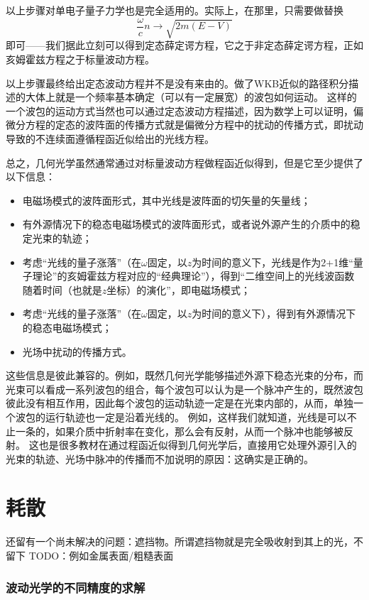 以上步骤对单电子量子力学也是完全适用的。实际上，在那里，只需要做替换
\[
    \frac{\omega}{c} n \longrightarrow \sqrt{2m(E-V)}
\]
即可——我们据此立刻可以得到定态薛定谔方程，它之于非定态薛定谔方程，正如亥姆霍兹方程之于标量波动方程。

以上步骤最终给出定态波动方程并不是没有来由的。做了WKB近似的路径积分描述的大体上就是一个频率基本确定（可以有一定展宽）的波包如何运动。
这样的一个波包的运动方式当然也可以通过定态波动方程描述，因为数学上可以证明，偏微分方程的定态的波阵面的传播方式就是偏微分方程中的扰动的传播方式，即扰动导致的不连续面遵循程函近似给出的光线方程。

总之，几何光学虽然通常通过对标量波动方程做程函近似得到，但是它至少提供了以下信息：
\begin{itemize}
    \item 电磁场模式的波阵面形式，其中光线是波阵面的切矢量的矢量线；
    \item 有外源情况下的稳态电磁场模式的波阵面形式，或者说外源产生的介质中的稳定光束的轨迹；
    \item 考虑“光线的量子涨落”（在$\omega$固定，以$z$为时间的意义下，光线是作为2+1维“量子理论”的亥姆霍兹方程对应的“经典理论”），得到“二维空间上的光线波函数随着时间（也就是$z$坐标）的演化”，即电磁场模式；
    \item 考虑“光线的量子涨落”（在$\omega$固定，以$z$为时间的意义下），得到有外源情况下的稳态电磁场模式；
    \item 光场中扰动的传播方式。
\end{itemize}
这些信息是彼此兼容的。例如，既然几何光学能够描述外源下稳态光束的分布，而光束可以看成一系列波包的组合，每个波包可以认为是一个脉冲产生的，既然波包彼此没有相互作用，因此每个波包的运动轨迹一定是在光束内部的，从而，单独一个波包的运行轨迹也一定是沿着光线的。
例如，这样我们就知道，光线是可以不止一条的，如果介质中折射率在变化，那么会有反射，从而一个脉冲也能够被反射。
这也是很多教材在通过程函近似得到几何光学后，直接用它处理外源引入的光束的轨迹、光场中脉冲的传播而不加说明的原因：这确实是正确的。

\section{耗散}

还留有一个尚未解决的问题：遮挡物。所谓遮挡物就是完全吸收射到其上的光，不留下
TODO：例如金属表面/粗糙表面

\subsubsection{波动光学的不同精度的求解}

